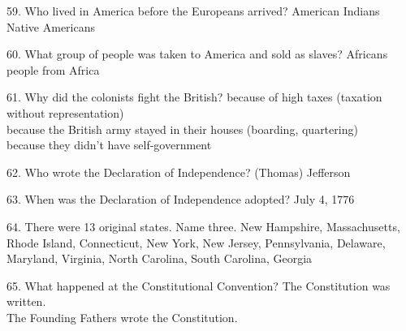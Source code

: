 \documentclass[avery5371,frame]{flashcards}
\begin{document}
        \begin{flashcard}{59. Who lived in America before the Europeans arrived?}
        {American Indians\\Native Americans}
        \end{flashcard}
        \begin{flashcard}{60. What group of people was taken to America and sold as slaves?}
        {Africans\\people from Africa}
        \end{flashcard}
        \begin{flashcard}{61. Why did the colonists fight the British?}
        {because of high taxes (taxation without representation)\\because the British army stayed in their houses (boarding, quartering)\\because they didn’t have self-government}
        \end{flashcard}
        \begin{flashcard}{62. Who wrote the Declaration of Independence?}
        {(Thomas) Jefferson}
        \end{flashcard}
        \begin{flashcard}{63. When was the Declaration of Independence adopted?}
        {July 4, 1776}
        \end{flashcard}
        \begin{flashcard}{64. There were 13 original states. Name three.}
        {New Hampshire\footnotesize, Massachusetts\footnotesize, Rhode Island\footnotesize, Connecticut\footnotesize, New York\footnotesize, New Jersey\footnotesize, Pennsylvania\footnotesize, Delaware\footnotesize, Maryland\footnotesize, Virginia\footnotesize, North Carolina\footnotesize, South Carolina\footnotesize, Georgia}
        \end{flashcard}
        \begin{flashcard}{65. What happened at the Constitutional Convention?}
        {The Constitution was written.\\The Founding Fathers wrote the Constitution.}
        \end{flashcard}
\end{document}
